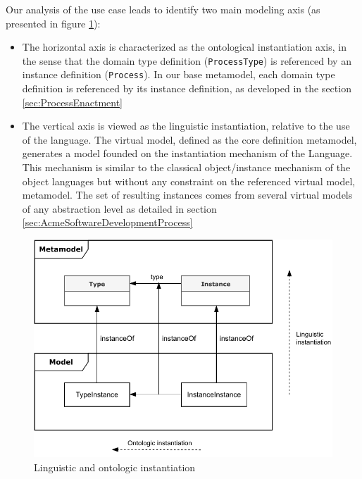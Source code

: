Our analysis of the use case leads to identify two main modeling axis (as presented in figure \ref{fig:LinguisticAndOntologicInstantiation}):
\begin{itemize}
    \item The horizontal axis is characterized as the ontological instantiation axis, in the sense that the domain type definition (\ie \texttt{ProcessType}) is referenced by an instance definition (\ie \texttt{Process}). In our base metamodel, each domain type definition is referenced by its instance definition, as developed in the section \ref{sec:ProcessEnactment}

\item The vertical axis is viewed as the linguistic instantiation, relative to the use of the \FML language. The virtual model, defined as the core definition metamodel, generates a model founded on the instantiation mechanism of the \FML Language. This mechanism is similar to the classical object/instance mechanism of the object languages but without any constraint on the referenced virtual model, \ie metamodel. The set of resulting instances comes from several virtual models 
of any abstraction level as detailed in section \ref{sec:AcmeSoftwareDevelopmentProcess}


\end{itemize}

\begin{figure}
    \centering
    \includegraphics[width=1.0 \columnwidth]{Figures/Instantiation.pdf}
    \caption{Linguistic and ontologic instantiation}
    \label{fig:LinguisticAndOntologicInstantiation}
\end{figure}

